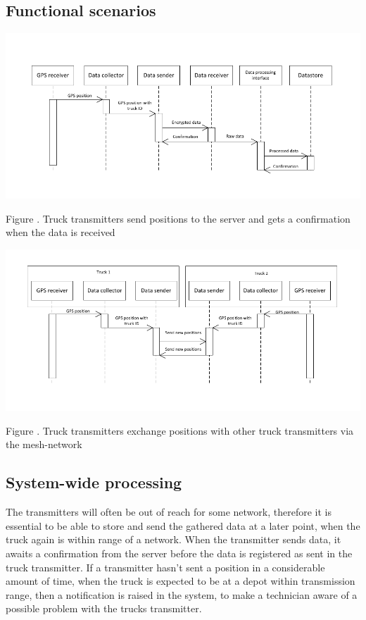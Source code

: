 \documentclass[a4paper,11pt]{report}
\newcommand{\mycaption}[1]{
  \addtocounter{figures}{1}
  Figure \arabic{figures}. #1
}
\begin{document}
\subsection{Functional scenarios}
\label{sec:functional-scenarios-1}

\begin{center}
  \includegraphics[width=\textwidth]{figures/functional_scenario}\\
  \mycaption{Truck transmitters send positions to the server and gets a confirmation when the data is received}
\end{center}

\begin{center}
  \includegraphics[width=\textwidth]{figures/functional_scenario_mesh}\\
  \mycaption{Truck transmitters exchange positions with other truck transmitters via the mesh-network}
\end{center}

\subsection{System-wide processing}
\label{sec:syst-wide-proc}

The transmitters will often be out of reach for some network, therefore it is essential to be able to store and send the gathered data at a later point, when the truck again is within range of a network. When the transmitter sends data, it awaits a confirmation from the server before the data is registered as sent in the truck transmitter. If a transmitter hasn't sent a position in a considerable amount of time, when the truck is expected to be at a depot within transmission range, then a notification is raised in the system, to make a technician aware of a possible problem with the trucks transmitter. 
\end{document}
